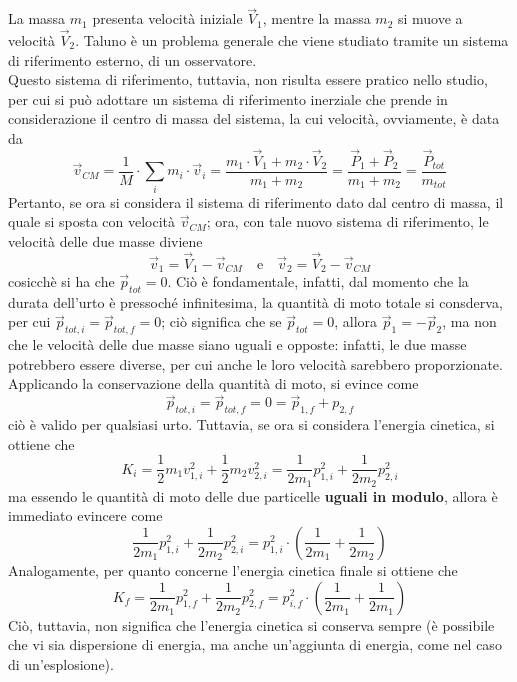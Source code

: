 \documentclass[a4paper]{extarticle}
\begin{document}
\noindent
La massa $m_1$ presenta velocità iniziale $\vec V_1$, mentre la massa $m_2$ si muove a velocità $\vec V_2$. Taluno è un problema generale che viene studiato tramite un sistema di riferimento esterno, di un osservatore.\\
Questo sistema di riferimento, tuttavia, non risulta essere pratico nello studio, per cui si può adottare un sistema di riferimento inerziale che prende in considerazione il centro di massa del sistema, la cui velocità, ovviamente, è data da
\[\vec v_{CM} = \frac{1}{M} \cdot \sum_i m_i \cdot \vec v_i = \frac{m_1 \cdot \vec V_1 + m_2 \cdot \vec V_2}{m_1+m_2} = \frac{\vec P_1 + \vec P_2}{m_1+m_2}=\frac{\vec P_{tot}}{m_{tot}}\]
Pertanto, se ora si considera il sistema di riferimento dato dal centro di massa, il quale si sposta con velocità $\vec v_{CM}$; ora, con tale nuovo sistema di riferimento, le velocità delle due masse diviene
\[\vec v_1 = \vec V_1 - \vec v_{CM} \hspace{1em} \text{e} \hspace{1em} \vec v_2 = \vec V_2 - \vec v_{CM}\]
cosicchè si ha che $\vec p_{tot}=0$. Ciò è fondamentale, infatti, dal momento che la durata dell'urto è pressoché infinitesima, la quantità di moto totale si consderva, per cui $\vec p_{tot,i} = \vec p_{tot,f} = 0$; ciò significa che se $\vec p_{tot} = 0$, allora $\vec p_1 = - \vec p_2$, ma non che le velocità delle due masse siano uguali e opposte: infatti, le due masse potrebbero essere diverse, per cui anche le loro velocità sarebbero proporzionate.\\
Applicando la conservazione della quantità di moto, si evince come
\[\boxed{\vec p_{tot,i} = \vec p_{tot,f} = 0 = \vec p_{1,f} + p_{2,f}}\]
ciò è valido per qualsiasi urto. Tuttavia, se ora si considera l'energia cinetica, si ottiene che
\[K_i = \frac{1}{2}m_1v_{1,i}^2 + \frac{1}{2}m_2v_{2,i}^2 = \frac{1}{2m_1} p_{1,i}^2 + \frac{1}{2m_2} p_{2,i}^2\]
ma essendo le quantità di moto delle due particelle \textbf{uguali in modulo}, allora è immediato evincere come
\[\frac{1}{2m_1} p_{1,i}^2 + \frac{1}{2m_2} p_{2,i}^2 = p_{1,i}^2 \cdot \left(\frac{1}{2m_1} + \frac{1}{2m_2}\right)\]
Analogamente, per quanto concerne l'energia cinetica finale si ottiene che
\[K_f = \frac{1}{2m_1} p_{1,f}^2 + \frac{1}{2m_2} p_{2,f}^2 = p_{i,f}^2 \cdot \left(\frac{1}{2m_1} + \frac{1}{2m_1}\right)\]
Ciò, tuttavia, non significa che l'energia cinetica si conserva sempre (è possibile che vi sia dispersione di energia, ma anche un'aggiunta di energia, come nel caso di un'esplosione).
\end{document}

